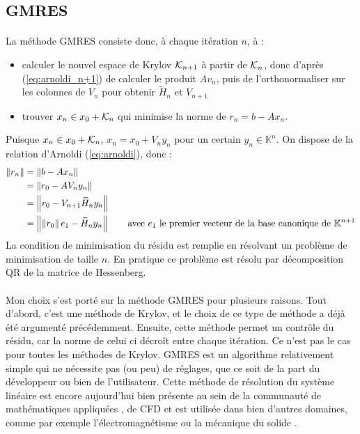 	\subsection{GMRES}

		\paragraph{}
		La méthode GMRES consiste donc, à chaque itération $n$, à :
		\begin{itemize}
			\item calculer le nouvel espace de Krylov $\krylov{n+1}$ à partir de $\krylov{n}$, donc d'après (\ref{eq:arnoldi_n+1}) de calculer le produit $Av_n$, puis de l'orthonormaliser sur les colonnes de $V_n$ pour obtenir $\widetilde{H}_n$ et $V_{n+1}$
			\item trouver $x_n \in x_0 + \krylov{n}$ qui minimise la norme de $r_n = b - Ax_n$.
		\end{itemize}
		Puisque $x_n \in x_0 + \krylov{n}$, $x_n = x_0 + V_n y_n$ pour un certain $y_n\in\mathbb{K}^n$.
		On dispose de la relation d'Arnoldi (\ref{eq:arnoldi}), donc :
		\begin{align*}
			\norm{r_n} &= \norm{b - Ax_n} \\
			&= \norm{r_0 - AV_ny_n} \\
			&= \norm{r_0 - V_{n+1}\widetilde{H}_ny_n} \\
			&= \norm{\norm{r_0} e_1 - \widetilde{H}_ny_n}\qquad\textrm{avec $e_1$ le premier vecteur de la base canonique de $\mathbb{K}^{n+1}$}
		\end{align*}
		La condition de minimisation du résidu est remplie en résolvant un problème de minimisation de taille $n$.
		En pratique ce problème est résolu par décomposition QR de la matrice de Hessenberg.

		\paragraph{}
		Mon choix s'est porté sur la méthode GMRES pour plusieurs raisons.
		Tout d'abord, c'est une méthode de Krylov, et le choix de ce type de méthode a déjà été argumenté précédemment.
		Ensuite, cette méthode permet un contrôle du résidu, car la norme de celui ci décroît entre chaque itération.
		Ce n'est pas le cas pour toutes les méthodes de Krylov.
		GMRES est un algorithme relativement simple qui ne nécessite pas (ou peu) de réglages, que ce soit de la part du développeur ou bien de l'utilisateur.
		Cette méthode de résolution du système linéaire est encore aujourd'hui bien présente au sein de la communauté de mathématiques appliquées \cite{Vasseur2016}, de CFD \cite{FrancoCamierAndrejEtAl2020} et est utilisée dans bien d'autres domaines, comme par exemple l'électromagnétisme \cite{ErnstGander2012} ou la mécanique du solide \cite{Mercier2015}.



